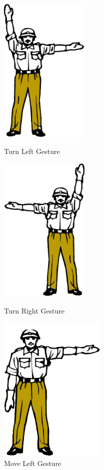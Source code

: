 \begin{figure}
	\centering 
	\begin{minipage}
		{.45 
		\textwidth} \centering 
		\includegraphics[height=7cm]{figures/content/ges-turn-left.png} \caption{Turn Left Gesture} \label{fg:ges:2} 
	\end{minipage}
	\begin{minipage}
		{.45 
		\textwidth} \centering 
		\includegraphics[height=7cm]{figures/content/ges-turn-right.png} \caption{Turn Right Gesture} \label{fg:ges:3} 
	\end{minipage}
	\begin{minipage}
		{.45 
		\textwidth} \centering 
		\includegraphics[height=7cm]{figures/content/ges-move-left.png} \caption{Move Left Gesture} \label{fg:ges:4} 

\end{minipage}
\end{figure}
